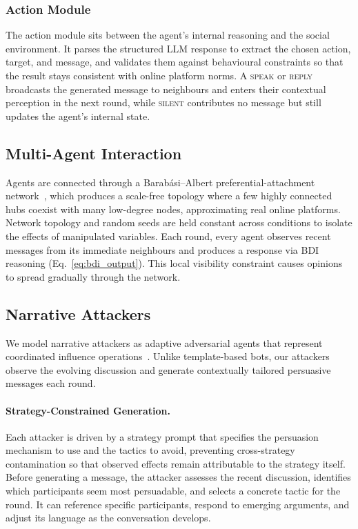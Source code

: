 \subsubsection{Action Module}

The action module sits between the agent's internal reasoning and the social environment. It parses the structured LLM response to extract the chosen action, target, and message, and validates them against behavioural constraints so that the result stays consistent with online platform norms. A \textsc{speak} or \textsc{reply} broadcasts the generated message to neighbours and enters their contextual perception in the next round, while \textsc{silent} contributes no message but still updates the agent's internal state.


\subsection{Multi-Agent Interaction}
\label{sec:interaction}

Agents are connected through a Barab\'{a}si--Albert preferential-attachment network~\citep{Barabasi1999}, which produces a scale-free topology where a few highly connected hubs coexist with many low-degree nodes, approximating real online platforms. Network topology and random seeds are held constant across conditions to isolate the effects of manipulated variables. Each round, every agent observes recent messages from its immediate neighbours and produces a response via BDI reasoning (Eq.~\ref{eq:bdi_output}). This local visibility constraint causes opinions to spread gradually through the network.


\subsection{Narrative Attackers}
\label{sec:malicious}

We model narrative attackers as adaptive adversarial agents that represent coordinated influence operations~\citep{Ferrara2016}. Unlike template-based bots, our attackers observe the evolving discussion and generate contextually tailored persuasive messages each round.

\paragraph{Strategy-Constrained Generation.}
Each attacker is driven by a strategy prompt that specifies the persuasion mechanism to use and the tactics to avoid, preventing cross-strategy contamination so that observed effects remain attributable to the strategy itself. Before generating a message, the attacker assesses the recent discussion, identifies which participants seem most persuadable, and selects a concrete tactic for the round. It can reference specific participants, respond to emerging arguments, and adjust its language as the conversation develops.

